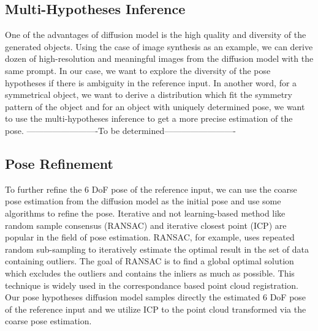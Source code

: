 \documentclass[12pt,DIV14,BCOR12mm,a4paper,footinclude=false,headinclude,parskip=half-,twoside,openright,cleardoublepage=empty,toc=index,bibliography=totoc,listof=totoc]{scrreprt}
\numberwithin{equation}{chapter}
\begin{document}
\subsection{Multi-Hypotheses Inference}
One of the advantages of diffusion model is the high quality and diversity of the generated objects. Using the case of image synthesis as an example, we can derive dozen of high-resolution and meaningful images from the diffusion model with the same prompt. In our case, we want to explore the diversity of the pose hypotheses if there is ambiguity in the reference input. In another word, for a symmetrical object, we want to derive a distribution which fit the symmetry pattern of the object and for an object with uniquely determined pose, we want to use the multi-hypotheses inference to get a more precise estimation of the pose.
-------------------------To be determined-------------------------

\subsection{Pose Refinement}
To further refine the 6 DoF pose of the reference input, we can use the coarse pose estimation from the diffusion model as the initial pose and use some algorithms to refine the pose. Iterative and not learning-based method like random sample consensus (RANSAC)\cite{10.1145/358669.358692} and iterative closest point (ICP)\cite{121791} are popular in the field of pose estimation. RANSAC, for example, uses repeated random sub-sampling to iteratively estimate the optimal result in the set of data containing outliers. The goal of RANSAC is to find a global optimal solution which excludes the outliers and contains the inliers as much as possible. This technique is widely used in the correspondance based point cloud registration. Our pose hypotheses diffusion model samples directly the estimated 6 DoF pose of the reference input and we utilize ICP to the point cloud transformed via the coarse pose estimation. 
\end{document}
